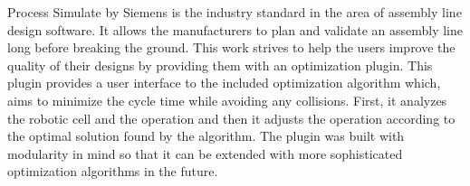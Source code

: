 Process Simulate by Siemens is the industry standard in the area of assembly line design software. 
It allows the manufacturers to plan and validate an assembly line long before breaking the ground.
This work strives to help the users improve the quality of their designs by providing them with an optimization plugin.
This plugin provides a user interface to the included optimization algorithm which, aims to minimize the cycle time while avoiding any collisions. 
First, it analyzes the robotic cell and the operation and then it adjusts the operation according to the optimal solution found by the algorithm. 
The plugin was built with modularity in mind so that it can be extended with more sophisticated optimization algorithms in the future.